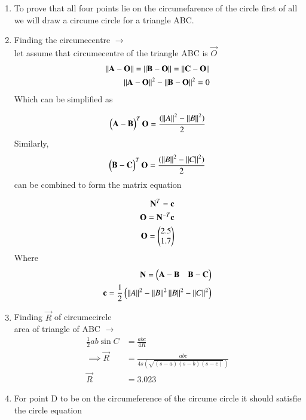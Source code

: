 \begin{enumerate}[label=\thesection.\arabic*.,ref=\thesection.\theenumi]

%
\item To prove that all four points lie on the circumefarence of the circle first of all we will draw a circume circle for a triangle ABC.

\item Finding the circumecentre $\to$
\\
let assume that circumecentre of the triangle ABC is $\vec{O}$
\begin{align}
\left\lVert\mathbf{A}-\mathbf{O}\right\rVert = \left\lVert\mathbf{B}-\mathbf{O}\right\rVert = \left\lVert\mathbf{C}-\mathbf{O}\right\rVert
\\
\left\lVert\mathbf{A}-\mathbf{O}\right\rVert^2 - \left\lVert\mathbf{B}-\mathbf{O}\right\rVert^2 = 0
\end{align}
Which can be simplified as

\begin{align}
\begin{pmatrix}\mathbf{A}-\mathbf{B}\end{pmatrix}^T \mathbf{O} = \frac{(\left\lVert A\right\rVert^2 -\left\lVert B\right\rVert^2)}{2}
\end{align}
Similarly,
\begin{align}
\begin{pmatrix}\mathbf{B}-\mathbf{C}\end{pmatrix}^T \mathbf{O} = \frac{(\left\lVert B\right\rVert^2 -\left\lVert C\right\rVert^2)}{2}
\end{align}
can be combined to form the matrix equation 

\begin{align}
\mathbf{N}^T = \mathbf{c}
\\
\mathbf{O} = \mathbf{N}^{-T} \mathbf{c}
\\
\mathbf{O} = \begin{pmatrix}2.5\\1.7\end{pmatrix}
\end{align}
Where
\begin{align}
\mathbf{N} = \begin{pmatrix}\mathbf{A} -\mathbf{B} & \mathbf{B} -\mathbf{C}\end{pmatrix}
\\
\mathbf{c} = \frac{1}{2}\begin{pmatrix}\left\lVert A\right\rVert^2 -\left\lVert B\right\rVert^2  \left\lVert B\right\rVert^2 - \left\lVert C\right\rVert^2\end{pmatrix}
\end{align}
\item  Finding $\vec{R}$ of circumecircle
\\
area of triangle of ABC $\to$
\begin{align}
\frac{1}{2}ab\sin{C}& = \frac{abc}{4R}
\\
\implies \vec{R} &= \frac{abc}{4s(\sqrt{\left(s-a\right)\left(s-b\right)\left(s-c\right)})}
\\
\vec{R}& = 3.023
\end{align}

\item For point D to be on the circumeference of the circume circle it should satisfie the circle equation 


\end{enumerate}
